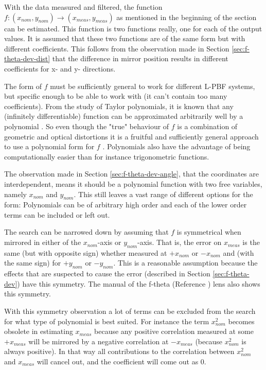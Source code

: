 With the data measured and filtered, the function $f: (x_{nom}, y_{nom}) \rightarrow  (x_{meas}, y_{meas})$ as mentioned in the beginning of the section can be estimated. This function is two functions really, one for each of the output values. It is assumed that these two functions are of the same form but with different coefficients. This follows from the observation made in Section \ref{sec:f-theta-dev-dist} that the difference in mirror position results in different coefficients for x- and y- directions.

The form of $f$ must be sufficiently general to work for different L-PBF systems, but specific enough to be able to work with (it can't contain too many coefficients). From the study of Taylor polynomials, it is known that any (infinitely differentiable) function can be approximated arbitrarily well by a polynomial \cite[eNote 4]{mat1-efterår}. So even though the "true" behaviour of $f$ is a combination of geometric and optical distortions it is a fruitful and sufficiently general approach to use a polynomial form for $f$ \cite{correction-cals}. Polynomials also have the advantage of being computationally easier than for instance trigonometric functions.

The observation made in Section \ref{sec:f-theta-dev-angle}, that the coordinates are interdependent, means it should be a polynomial function with two free variables, namely $x_{nom}$ and $y_{nom}$. This still leaves a vast range of different options for the form: Polynomials can be of arbitrary high order and each of the lower order terms can be included or left out.

The search can be narrowed down by assuming that $f$ is symmetrical when mirrored in either of the $x_{nom}$-axis or $y_{nom}$-axis. That is, the error on $x_{meas}$ is the same (but with opposite sign) whether measured at $+x_{nom}$ or $-x_{nom}$ and (with the same sign) for $+y_{nom}$ or $-y_{nom}$. This is a reasonable assumption because the effects that are suspected to cause the error (described in Section \ref{sec:f-theta-dev}) have this symmetry. The manual of the f-theta (Reference \cite{f-theta-lens-spec}) lens also shows this symmetry.

With this symmetry observation a lot of terms can be excluded from the search for what type of polynomial is best suited. For instance the term $x_{nom}^2$ becomes obsolete in estimating $x_{meas}$ because any positive correlation measured at some $+x_{meas}$ will be mirrored by a negative correlation at $-x_{meas}$ (because $x_{nom}^2$ is always positive). In that way all contributions to the correlation between $x_{nom}^2$ and $x_{meas}$ will cancel out, and the coefficient will come out as 0.


